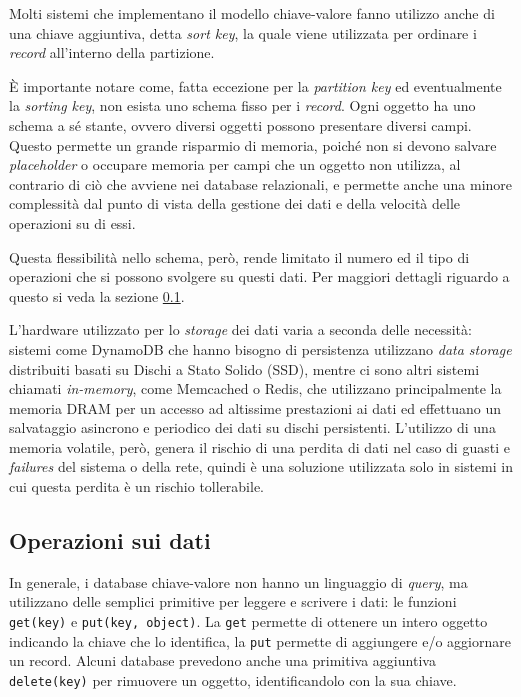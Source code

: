 Molti sistemi che implementano il modello chiave-valore fanno utilizzo anche di una chiave aggiuntiva, detta \textit{sort key}, la quale viene utilizzata per ordinare i \textit{record} all'interno della partizione.

È importante notare come, fatta eccezione per la \textit{partition key} ed eventualmente la \textit{sorting key}, non esista uno schema fisso per i \textit{record}. Ogni oggetto ha uno schema a sé stante, ovvero diversi oggetti possono presentare diversi campi. Questo permette un grande risparmio di memoria, poiché non si devono salvare \textit{placeholder} o occupare memoria per campi che un oggetto non utilizza, al contrario di ciò che avviene nei database relazionali, e permette anche una minore complessità dal punto di vista della gestione dei dati e della velocità delle operazioni su di essi.

Questa flessibilità nello schema, però, rende limitato il numero ed il tipo di operazioni che si possono svolgere su questi dati. Per maggiori dettagli riguardo a questo si veda la sezione \ref{ops}.

L'hardware utilizzato per lo \textit{storage} dei dati varia a seconda delle necessità: sistemi come DynamoDB che hanno bisogno di persistenza utilizzano \textit{data storage} distribuiti basati su Dischi a Stato Solido (SSD), mentre ci sono altri sistemi chiamati \textit{in-memory}, come Memcached o Redis, che utilizzano principalmente la memoria DRAM per un accesso ad altissime prestazioni ai dati ed effettuano un salvataggio asincrono e periodico dei dati su dischi persistenti. L'utilizzo di una memoria volatile, però, genera il rischio di una perdita di dati nel caso di guasti e \textit{failures} del sistema o della rete, quindi è una soluzione utilizzata solo in sistemi in cui questa perdita è un rischio tollerabile. 

\subsection{Operazioni sui dati}\label{ops}

In generale, i database chiave-valore non hanno un linguaggio di \textit{query}, ma utilizzano delle semplici primitive per leggere e scrivere i dati: le funzioni \verb|get(key)| e \verb|put(key, object)|. La \verb|get| permette di ottenere un intero oggetto indicando la chiave che lo identifica, la \verb|put| permette di aggiungere e/o aggiornare un record. Alcuni database prevedono anche una primitiva aggiuntiva \verb|delete(key)| per rimuovere un oggetto, identificandolo con la sua chiave.

